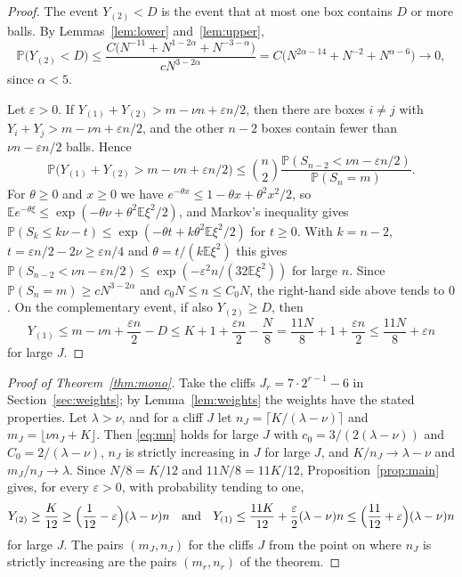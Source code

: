 \documentclass[11pt]{amsart}
\theoremstyle{remark}
\numberwithin{equation}{section}
\newcommand{\Pp}{\mathbb P}
\newcommand{\E}{\mathbb E}
\begin{document}
\begin{proof}
The event $Y_{(2)}<D$ is the event that at most one box contains $D$ or more balls. By Lemmas~\ref{lem:lower} and~\ref{lem:upper},
\[
\Pp\bigl(Y_{(2)}<D\bigr)\le\frac{C\bigl(N^{-11}+N^{1-2\alpha}+N^{-3-\alpha}\bigr)}{cN^{3-2\alpha}}=C\bigl(N^{2\alpha-14}+N^{-2}+N^{\alpha-6}\bigr)\to0,
\]
since $\alpha<5$.

Let $\varepsilon>0$. If $Y_{(1)}+Y_{(2)}>m-\nu n+\varepsilon n/2$, then there are boxes $i\ne j$ with $Y_i+Y_j>m-\nu n+\varepsilon n/2$, and the other $n-2$ boxes contain fewer than $\nu n-\varepsilon n/2$ balls. Hence
\[
\Pp\bigl(Y_{(1)}+Y_{(2)}>m-\nu n+\varepsilon n/2\bigr)\le\binom n2\frac{\Pp(S_{n-2}<\nu n-\varepsilon n/2)}{\Pp(S_n=m)}.
\]
For $\theta\ge0$ and $x\ge0$ we have $e^{-\theta x}\le1-\theta x+\theta^2x^2/2$, so $\E e^{-\theta\xi}\le\exp(-\theta\nu+\theta^2\E\xi^2/2)$, and Markov's inequality gives $\Pp(S_k\le k\nu-t)\le\exp(-\theta t+k\theta^2\E\xi^2/2)$ for $t\ge0$. With $k=n-2$, $t=\varepsilon n/2-2\nu\ge\varepsilon n/4$ and $\theta=t/(k\E\xi^2)$ this gives $\Pp(S_{n-2}<\nu n-\varepsilon n/2)\le\exp(-\varepsilon^2n/(32\E\xi^2))$ for large $n$. Since $\Pp(S_n=m)\ge cN^{3-2\alpha}$ and $c_0N\le n\le C_0N$, the right-hand side above tends to $0$. On the complementary event, if also $Y_{(2)}\ge D$, then
\[
Y_{(1)}\le m-\nu n+\frac{\varepsilon n}2-D\le K+1+\frac{\varepsilon n}2-\frac N8=\frac{11N}8+1+\frac{\varepsilon n}2\le\frac{11N}8+\varepsilon n
\]
for large $J$.
\end{proof}

\begin{proof}[Proof of Theorem~\ref{thm:mono}]
Take the cliffs $J_r=7\cdot2^{r-1}-6$ in Section~\ref{sec:weights}; by Lemma~\ref{lem:weights} the weights have the stated properties. Let $\lambda>\nu$, and for a cliff $J$ let $n_J=\lceil K/(\lambda-\nu)\rceil$ and $m_J=\lfloor\nu n_J+K\rfloor$. Then \eqref{eq:mn} holds for large $J$ with $c_0=3/(2(\lambda-\nu))$ and $C_0=2/(\lambda-\nu)$, $n_J$ is strictly increasing in $J$ for large $J$, and $K/n_J\to\lambda-\nu$ and $m_J/n_J\to\lambda$. Since $N/8=K/12$ and $11N/8=11K/12$, Proposition~\ref{prop:main} gives, for every $\varepsilon>0$, with probability tending to one,
\[
Y_{(2)}\ge\frac K{12}\ge\Bigl(\frac1{12}-\varepsilon\Bigr)(\lambda-\nu)n\quad\text{and}\quad Y_{(1)}\le\frac{11K}{12}+\frac{\varepsilon}2(\lambda-\nu)n\le\Bigl(\frac{11}{12}+\varepsilon\Bigr)(\lambda-\nu)n
\]
for large $J$. The pairs $(m_J,n_J)$ for the cliffs $J$ from the point on where $n_J$ is strictly increasing are the pairs $(m_r,n_r)$ of the theorem.
\end{proof}
\end{document}

